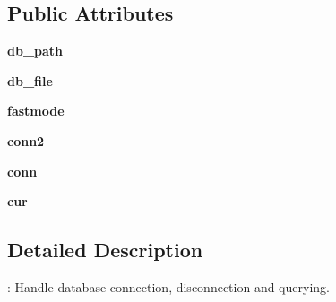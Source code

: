 \subsection*{\-Public \-Attributes}
\begin{DoxyCompactItemize}
\item 
\hypertarget{classMycarn_1_1Sqlite__manager_1_1Sqlite__manager_af22af019c0ec48e3caf672b797e2fba1}{
{\bfseries db\-\_\-path}}
\label{classMycarn_1_1Sqlite__manager_1_1Sqlite__manager_af22af019c0ec48e3caf672b797e2fba1}

\item 
\hypertarget{classMycarn_1_1Sqlite__manager_1_1Sqlite__manager_a869ec47706c86bb5ea452f4d12de78c2}{
{\bfseries db\-\_\-file}}
\label{classMycarn_1_1Sqlite__manager_1_1Sqlite__manager_a869ec47706c86bb5ea452f4d12de78c2}

\item 
\hypertarget{classMycarn_1_1Sqlite__manager_1_1Sqlite__manager_adad50555b0b26585d28f727f4ffc855d}{
{\bfseries fastmode}}
\label{classMycarn_1_1Sqlite__manager_1_1Sqlite__manager_adad50555b0b26585d28f727f4ffc855d}

\item 
\hypertarget{classMycarn_1_1Sqlite__manager_1_1Sqlite__manager_af3c68b0b368176d9443d6a079ba1aaa2}{
{\bfseries conn2}}
\label{classMycarn_1_1Sqlite__manager_1_1Sqlite__manager_af3c68b0b368176d9443d6a079ba1aaa2}

\item 
\hypertarget{classMycarn_1_1Sqlite__manager_1_1Sqlite__manager_acb2637b91a2cc6c54aea8331e73985bb}{
{\bfseries conn}}
\label{classMycarn_1_1Sqlite__manager_1_1Sqlite__manager_acb2637b91a2cc6c54aea8331e73985bb}

\item 
\hypertarget{classMycarn_1_1Sqlite__manager_1_1Sqlite__manager_aad4300e8bda6374ef754d065f5060050}{
{\bfseries cur}}
\label{classMycarn_1_1Sqlite__manager_1_1Sqlite__manager_aad4300e8bda6374ef754d065f5060050}

\end{DoxyCompactItemize}


\subsection{\-Detailed \-Description}
\-: \-Handle database connection, disconnection and querying. 

